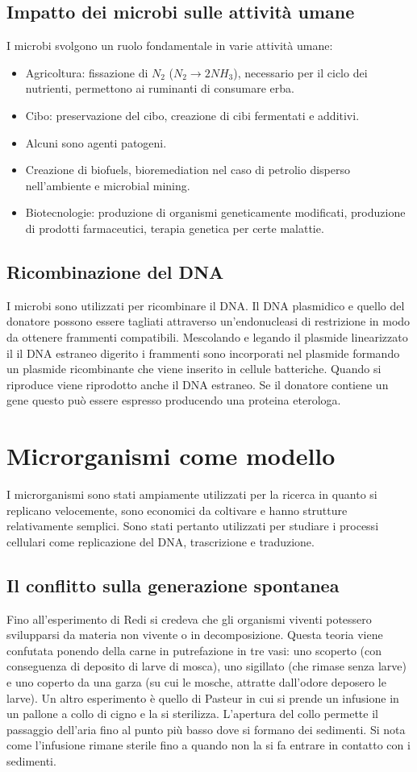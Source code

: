 \subsection{Impatto dei microbi sulle attivit\`a umane}
I microbi svolgono un ruolo fondamentale in varie attivit\`a umane:
\begin{itemize}
\item Agricoltura: fissazione di $N_2$ ($N_2\rightarrow 2NH_3$), necessario per il ciclo dei nutrienti, permettono ai ruminanti di consumare erba.
\item Cibo: preservazione del cibo, creazione di cibi fermentati e additivi.
\item Alcuni sono agenti patogeni.
\item Creazione di biofuels, bioremediation nel caso di petrolio disperso nell'ambiente e microbial mining.
\item Biotecnologie: produzione di organismi geneticamente modificati, produzione di prodotti farmaceutici, terapia genetica per certe malattie. 
\end{itemize}
\subsection{Ricombinazione del DNA}
I microbi sono utilizzati per ricombinare il DNA. Il DNA plasmidico e quello del donatore possono essere tagliati attraverso un'endonucleasi di restrizione
in modo da ottenere frammenti compatibili. Mescolando e legando il plasmide linearizzato il il DNA estraneo digerito i frammenti sono incorporati nel 
plasmide formando un plasmide ricombinante che viene inserito in cellule batteriche. Quando si riproduce viene riprodotto anche il DNA estraneo. Se il 
donatore contiene un gene questo pu\`o essere espresso producendo una proteina eterologa. 
\section{Microrganismi come modello}
I microrganismi sono stati ampiamente utilizzati per la ricerca in quanto si replicano velocemente, sono economici da coltivare e hanno strutture 
relativamente semplici. Sono stati pertanto utilizzati per studiare i processi cellulari come replicazione del DNA, trascrizione e traduzione. 
\subsection{Il conflitto sulla generazione spontanea}
Fino all'esperimento di Redi si credeva che gli organismi viventi potessero svilupparsi da materia non vivente o in decomposizione. Questa teoria viene
confutata ponendo della carne in putrefazione in tre vasi: uno scoperto (con conseguenza di deposito di larve di mosca), uno sigillato (che rimase senza 
larve) e uno coperto da una garza (su cui le mosche, attratte dall'odore deposero le larve). Un altro esperimento \`e quello di Pasteur in cui si prende un infusione in un pallone a 
collo di cigno e la si sterilizza. L'apertura del collo permette il passaggio dell'aria fino al punto pi\`u basso dove si formano dei sedimenti. Si nota come l'infusione rimane sterile
fino a quando non la si fa entrare in contatto con i sedimenti. 
